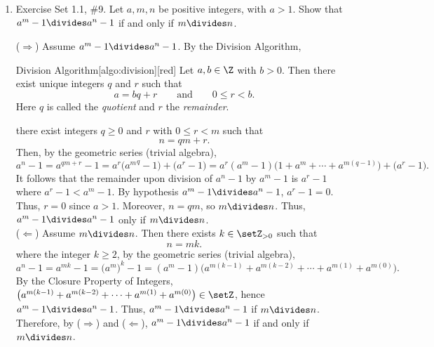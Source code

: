 \begin{enumerate}
  \newpage

  \item Exercise Set 1.1, \#9. Let $a, m, n$ be positive integers, with $a > 1$. Show that $a^{m}-1 \divides a^{n}-1$ if and only if $m\divides n$.
  \begin{subprove}
    ($\Rightarrow$) Assume $a^{m}-1\divides a^{n}-1$. By the Division Algorithm,
    \begin{define}{Division Algorithm}[algo:division][red]
    Let $a,b\in\Z$ with $b>0$. Then there exist unique integers $q$ and $r$ such that
    \[
    a = b q + r \qquad\text{and}\qquad 0\le r < b.
    \]
    Here $q$ is called the \emph{quotient} and $r$ the \emph{remainder}.
    \end{define}
    there exist integers $q\ge 0$ and $r$ with $0\le r<m$ such that
    \[
      n = qm + r.
    \]
    Then, by the geometric series (trivial algebra),
    \[
      a^{n}-1 = a^{qm+r}-1 = a^{r}\bigl({a^{m}}^{q}-1\bigr) + \bigl(a^{r}-1\bigr)= a^{r}(a^{m}-1)\bigl(1+a^{m}+\cdots+a^{m(q-1)}\bigr) + \bigl(a^{r}-1\bigr).
    \]
    It follows that the remainder upon division of $a^{n}-1$ by $a^{m}-1$ is $a^{r}-1$ where $a^{r}-1 < a^{m}-1$. 
    By hypothesis 
    $a^{m}-1\divides a^{n}-1$, $a^{r}-1=0$. 
    Thus, $r=0$ since $a>1$. Moreover, $n=qm$, so $m\divides n$.
    Thus, $a^{m}-1 \divides a^{n}-1$ only if $m\divides n$.\vspace*{10px}\\
    ($\Leftarrow$) Assume $m\divides n$. Then there exists $k\in\setZ_{>0}$ such that
    \[
      n = m k.
    \]
    where the integer $k\ge 2$, by the geometric series (trivial algebra),
    \[
      a^{n}-1 = a^{mk}-1 = \bigl(a^{m}\bigr)^{k}-1
        = (a^{m}-1)\bigl(a^{m(k-1)}+a^{m(k-2)}+\cdots + a^{m(1)}+a^{m(0)}\bigr).
    \]
    By the Closure Property of Integers, $\bigl(a^{m(k-1)}+a^{m(k-2)}+\cdots + a^{m(1)}+a^{m(0)}\bigr)\in\setZ$, 
    hence $a^{m}-1\divides a^{n}-1$. 
    Thus, $a^{m}-1 \divides a^{n}-1$ if $m\divides n$.\vspace*{10px}\\
    Therefore, by ($\Rightarrow$) and ($\Leftarrow$), $a^{m}-1 \divides a^{n}-1$ if and only if $m\divides n$.
  \end{subprove}


  \newpage


\end{enumerate}
